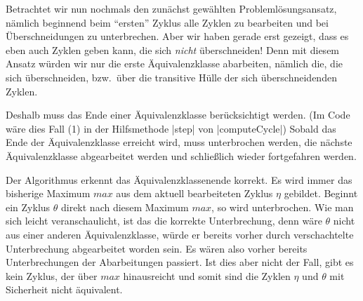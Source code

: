 Betrachtet wir nun nochmals den zunächst gewählten Problemlösungsansatz, nämlich beginnend beim ``ersten'' Zyklus alle Zyklen zu bearbeiten und bei Überschneidungen zu unterbrechen.
Aber wir haben gerade erst gezeigt, dass es eben auch Zyklen geben kann, die sich \emph{nicht} überschneiden!
Denn mit diesem Ansatz würden wir nur die erste Äquivalenzklasse abarbeiten, nämlich die, die sich überschneiden, bzw.\ über die transitive Hülle der sich überschneidenden Zyklen.

Deshalb muss das Ende einer Äquivalenzklasse berücksichtigt werden. (Im Code wäre dies Fall (1) in der Hilfsmethode |step| von |computeCycle|)
Sobald das Ende der Äquivalenzklasse erreicht wird, muss unterbrochen werden, die nächste Äquivalenzklasse abgearbeitet werden und schließlich wieder fortgefahren werden.

Der Algorithmus erkennt das Äquivalenzklassenende korrekt. Es wird immer das bisherige Maximum $max$ aus dem aktuell bearbeiteten Zyklus $\eta$ gebildet.
Beginnt ein Zyklus $\theta$ direkt nach diesem Maximum $max$, so wird unterbrochen.
Wie man sich leicht veranschaulicht, ist das die korrekte Unterbrechung, denn wäre $\theta$ nicht aus einer anderen Äquivalenzklasse,
würde er bereits vorher durch verschachtelte Unterbrechung abgearbeitet worden sein. Es wären also vorher bereits Unterbrechungen der Abarbeitungen passiert.
Ist dies aber nicht der Fall, gibt es kein Zyklus, der über $max$ hinausreicht und somit sind die Zyklen $\eta$ und $\theta$ mit Sicherheit nicht äquivalent.

